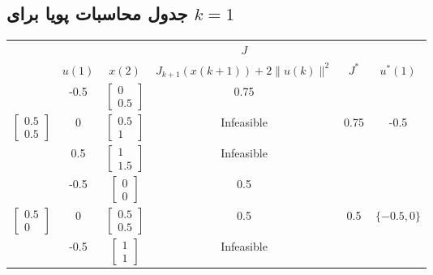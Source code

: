 \subsection*{جدول محاسبات پویا برای \( k = 1 \)}
\begin{latin}
	\begin{longtable}{|c|c|c|c|c|c|}
		\hline
		\rowcolor[HTML]{00D2CB} 
		& 	 & 	 & $J$ &	 &	\\
		\rowcolor[HTML]{00D2CB} 
		\multirow{-2}{*}{$x(1)$}	&\multirow{-2}{*}{$u(1)$ }	&\multirow{-2}{*}{$x(2)$}	& $J_{k+1}(x(k+1)) + 2\|u(k)\|^2$ &\multirow{-2}{*}{$J^*$}	& \multirow{-2}{*}{$u^*(1)$}\\ \hline
		\endfirsthead                                                 
		\endhead
		&-0.5&$\begin{bmatrix} 0 \\ 0.5 \end{bmatrix}$&0.75&	&	\\  \cline{2-4} 
		\multirow{-3}{*}{$\begin{bmatrix} 0.5 \\ 0.5 \end{bmatrix}$}&0&$\begin{bmatrix} 0.5 \\ 1 \end{bmatrix}$&Infeasible&0.75&-0.5	\\  \cline{2-4} 		
		&0.5&$\begin{bmatrix} 1 \\ 1.5 \end{bmatrix}$&Infeasible&	&	\\  \cline{2-4} \hline
		
		&      -0.5                  &$\begin{bmatrix} 0 \\ 0 \end{bmatrix}$      &     0.5 &             &   \\  \cline{2-4} 
		\multirow{-3}{*}{$\begin{bmatrix} 0.5 \\ 0 \end{bmatrix}$}&        0                &$\begin{bmatrix} 0.5 \\ 0.5 \end{bmatrix}$      &      0.5                  &    0.5     &  $\{-0.5,0\}$   \\  \cline{2-4} 
		&         -0.5               &$\begin{bmatrix} 1 \\ 1 \end{bmatrix}$      & Infeasible                        &              &   \\  \cline{2-4} \hline
		

\end{longtable}
\end{latin}
